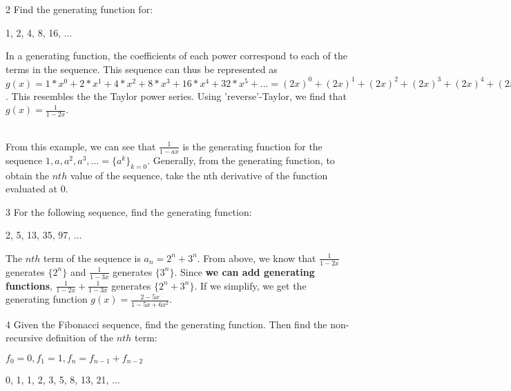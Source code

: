 \begin{problem}
    2 Find the generating function for:
     \begin{center} 1, 2, 4, 8, 16, ...\end{center}
\end{problem}
\begin{solution}
In a generating function, the coefficients of each power correspond to each of the terms in the sequence. This sequence can thus be represented as $g(x) = 1*x^{0} + 2*x^{1} + 4*x^{2} + 8*x^{3} + 16*x^{4} + 32*x^{5} + ... = (2x)^0 + (2x)^1 + (2x)^2 + (2x)^3 + (2x)^4 + (2x)^5 + ...$. This resembles the the Taylor power series. Using 'reverse'-Taylor, we find that $g(x) = \frac{1}{1-2x}$. 
\end{solution} \\
 
From this example, we can see that $\frac{1}{1-ax}$ is the generating function for the sequence $1, a, a^2, a^3, ... = \{a^k\}_{k=0}$. Generally, from the generating function, to obtain the $nth$ value of the sequence, take the nth derivative of the function evaluated at 0.\newline

\begin{problem}
    3 For the following sequence, find the generating function:
    \begin{center} 2, 5, 13, 35, 97, ... \end{center}
\end{problem}

\begin{solution}
The $nth$ term of the sequence is $a_{n} = 2^{n} + 3^{n}$. From above, we know that $\frac{1}{1-2x}$ generates $\{2^n\}$ and $\frac{1}{1-3x}$ generates $\{3^n\}$. Since \textbf{we can add generating functions}, $\frac{1}{1-2x}+\frac{1}{1-3x}$ generates $\{2^n +3^n\}$. If we simplify, we get the generating function $g(x)=\frac{2-5x}{1-5x+6x^2}$.
\end{solution}

\begin{problem}
4 Given the Fibonacci sequence, find the generating function. Then find the non-recursive definition of the $nth$ term: 
\begin{center} $f_{0}=0, f_{1}=1, f_{n}=f_{n-1}+f_{n-2}$ \end{center}
\begin{center} 0, 1, 1, 2, 3, 5, 8, 13, 21, ... \end{center}
\end{problem}


